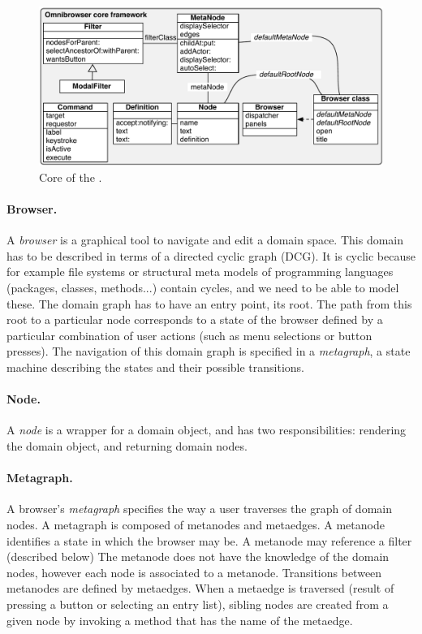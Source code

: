 \documentclass[a4paper,10pt,twoside]{book}
\begin{document}
\begin{figure}[!ht]
\begin{center}
\includegraphics[scale=0.59]{CoreOnly}
\caption{Core of the \obf. } 
\end{center}
\end{figure}

\paragraph{Browser.} A \emph{browser} is a graphical tool to navigate and edit a domain space. This domain has to be described in terms of a directed cyclic graph (DCG). It is cyclic because for example file systems or structural meta models of programming languages (\ie packages, classes, methods...) contain cycles, and we need to be able to model these. The domain graph has to have an entry point, its root. The path from this root to a particular node corresponds to a state of the browser defined by a particular combination of user actions (such as menu selections or button presses).
The navigation of this domain graph is specified in a \emph{metagraph}, a state machine describing the states and their possible transitions.

\paragraph{Node.} A \emph{node} is a wrapper for a domain object, and has two responsibilities: rendering the domain object, and returning domain nodes.

\paragraph{Metagraph.} A browser's \emph{metagraph} specifies the way a user traverses the graph of domain nodes. A metagraph is composed of metanodes and metaedges. A metanode identifies a state in which the browser may be. A metanode may reference a filter (described below)
The metanode does not have the knowledge of the domain nodes, however each node is associated to a metanode. Transitions between meta\-nodes are defined by metaedges. When a metaedge is traversed (\ie result of pressing a button or selecting an entry list), sibling nodes are created from a given node by invoking a method that has the name of the metaedge.
\end{document}
